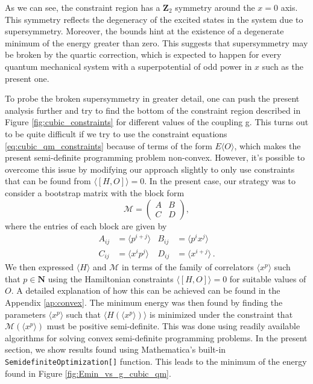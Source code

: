 \documentclass[a4paper,11pt]{article}
\numberwithin{equation}{section}
\begin{document}
As we can see, the constraint region has a $\textbf{Z}_2$ symmetry around the $x = 0$ axis. This symmetry reflects the degeneracy of the excited states in the system due to supersymmetry. Moreover, the bounds hint at the existence of a degenerate minimum of the energy greater than zero. This suggests that supersymmetry may be broken by the quartic correction, which is expected to happen for every quantum mechanical system with a superpotential of odd power in $x$ such as the present one. 

To probe the broken supersymmetry in greater detail, one can push the present analysis further and try to find the bottom of the constraint region described in Figure \ref{fig:cubic_constraints} for different values of the coupling g. This turns out to be quite difficult if we try to use the constraint equations \ref{eq:cubic_qm_constraints} because of terms of the form $E \langle O \rangle$, which makes the present semi-definite programming problem non-convex. However, it's possible to overcome this issue by modifying our approach slightly to only use constraints that can be found from $\langle [ H , O ] \rangle = 0$. In the present case, our strategy was to consider a bootstrap matrix with the block form
\begin{equation}
    \mathcal{M} = 
    \begin{pmatrix}
    A & B \\
    C & D
    \end{pmatrix} ,
    \label{eq:bloc_M}
\end{equation}
where the entries of each block are given by
\begin{align}
    A_{ij} & = \langle p^{i+j} \rangle & B_{ij} & = \langle p^i x^j \rangle \nonumber \\
    C_{ij} & = \langle x^{i} p^j \rangle & D_{ij} & = \langle x^{i+j} \rangle \, .
\end{align}
We then expressed $\langle H \rangle$ and $\mathcal{M}$ in terms of the family of correlators $\langle x^p \rangle$ such that $p \in \mathbf{N}$ using the Hamiltonian constraints $\langle [ H , O ] \rangle = 0$ for suitable values of $O$. A detailed explanation of how this can be achieved can be found in the Appendix \ref{ap:convex}. The minimum energy was then found by finding the parameters $\langle x^p \rangle$ such that $\langle H(\langle x^p \rangle)\rangle$ is minimized under the constraint that $\mathcal{M}(\langle x^p \rangle)$ must be positive semi-definite. This was done using readily available algorithms for solving convex semi-definite programming problems. In the present section, we show results found using Mathematica's built-in \texttt{SemidefiniteOptimization[]} function. This leads to the minimum of the energy found in Figure \ref{fig:Emin_vs_g_cubic_qm}.
\end{document}
